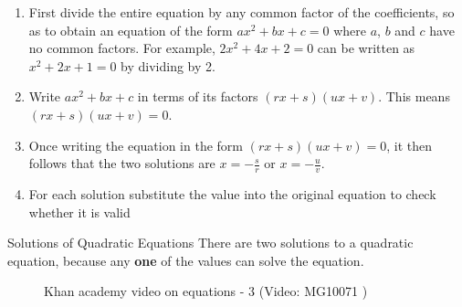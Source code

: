         \label{m39247*id150020}\begin{enumerate}[noitemsep, label=\textbf{\arabic*}. ] 
            \label{m39247*uid37}\item First divide the entire equation by any common factor of the coefficients,
so as to obtain an equation of the form $a{x}^{2}+bx+c=0$ where $a$, $b$ and
$c$ have no common factors. For example, $2{x}^{2}+4x+2=0$\hspace{1ex} can be written as
${x}^{2}+2x+1=0$\hspace{1ex} by dividing by 2.
\label{m39247*uid38}\item Write $a{x}^{2}+bx+c$ in terms of its factors $\left(rx+s\right)\left(ux+v\right)$.
This means $\left(rx+s\right)\left(ux+v\right)=0$.
\label{m39247*uid39}\item Once writing the equation in the form $\left(rx+s\right)\left(ux+v\right)=0$, it then
follows that the two solutions are $x=-\frac{s}{r}$ or $x=-\frac{u}{v}$.
\item For each solution substitute the value into the original equation to check whether it is valid\end{enumerate}
\label{m39247*secfhsst!!!underscore!!!id2128}
      {  Solutions of Quadratic Equations }
            \nopagebreak
        \label{m39247*id150373}There are two solutions to a
quadratic equation, because any \textbf{one} of the values can solve the
equation. \par 
\label{m39247*eip-388}
    \setcounter{subfigure}{0}
	\begin{figure}[H] %
    \textnormal{Khan academy video on equations - 3}\vspace{.1in} \nopagebreak
  \label{m39247*yt-media3}\label{m39247*yt-video3}
             { (Video:  MG10071 )}
      \vspace{2pt}
    \vspace{.1in}
 \end{figure}       \par \label{m39247*secfhsst!!!underscore!!!id2133}\vspace{.5cm} 
      \noindent
